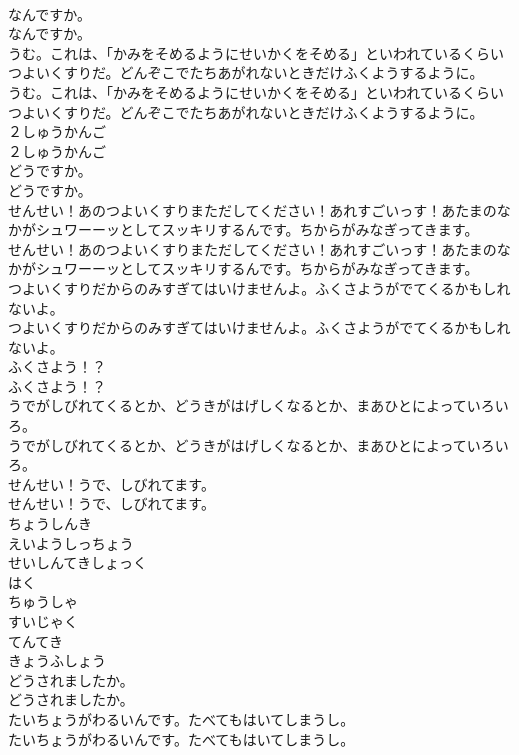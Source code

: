 \documentclass[8pt]{extreport}
\begin{document}
\begin{CJK}{UTF8}{min}
\\	なんですか。	
\\	なんですか。 
\\	うむ。これは、「かみをそめるようにせいかくをそめる」といわれているくらいつよいくすりだ。どんぞこでたちあがれないときだけふくようするように。	
\\	うむ。これは、「かみをそめるようにせいかくをそめる」といわれているくらいつよいくすりだ。どんぞこでたちあがれないときだけふくようするように。 
\\	２しゅうかんご	
\\	２しゅうかんご 
\\	どうですか。	
\\	どうですか。 
\\	せんせい！あのつよいくすりまただしてください！あれすごいっす！あたまのなかがシュワーーッとしてスッキリするんです。ちからがみなぎってきます。	
\\	せんせい！あのつよいくすりまただしてください！あれすごいっす！あたまのなかがシュワーーッとしてスッキリするんです。ちからがみなぎってきます。 
\\	つよいくすりだからのみすぎてはいけませんよ。ふくさようがでてくるかもしれないよ。	
\\	つよいくすりだからのみすぎてはいけませんよ。ふくさようがでてくるかもしれないよ。 
\\	ふくさよう！？	
\\	ふくさよう！？ 
\\	うでがしびれてくるとか、どうきがはげしくなるとか、まあひとによっていろいろ。	
\\	うでがしびれてくるとか、どうきがはげしくなるとか、まあひとによっていろいろ。 
\\	せんせい！うで、しびれてます。	
\\	せんせい！うで、しびれてます。 
\\	ちょうしんき
\\	えいようしっちょう
\\	せいしんてきしょっく
\\	はく
\\	ちゅうしゃ
\\	すいじゃく
\\	てんてき
\\	きょうふしょう
\\	どうされましたか。	
\\	どうされましたか。 
\\	たいちょうがわるいんです。たべてもはいてしまうし。	
\\	たいちょうがわるいんです。たべてもはいてしまうし。 

\end{CJK}
\end{document}

